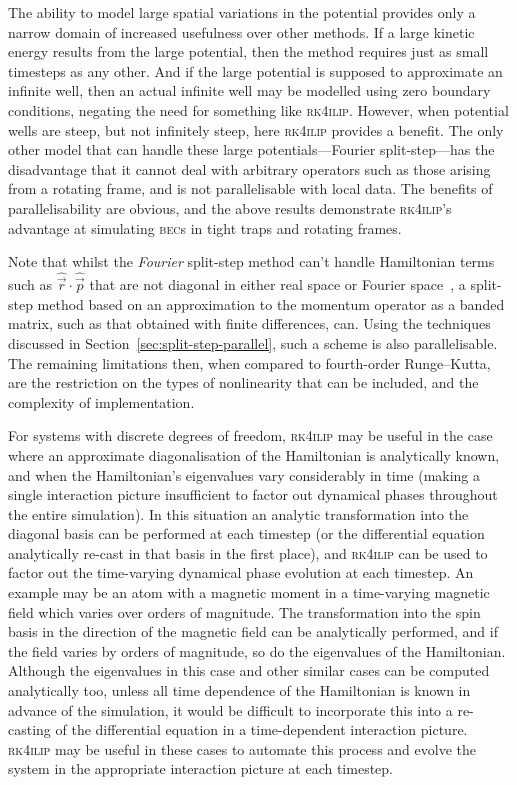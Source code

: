 The ability to model large spatial variations in the potential provides only a narrow domain of increased usefulness over other methods. If a large kinetic energy results from the large potential, then the method requires just as small timesteps as any other. And if the large potential is supposed to approximate an infinite well, then an actual infinite well may be modelled using zero boundary conditions, negating the need for something like \textsc{rk4ilip}. However, when potential wells are steep, but not infinitely steep, here \textsc{rk4ilip} provides a benefit. The only other model that can handle these large potentials---Fourier split-step---has the disadvantage that it cannot deal with arbitrary operators such as those arising from a rotating frame, and is not parallelisable with local data. The benefits of parallelisability are obvious, and the above results demonstrate \textsc{rk4ilip}'s advantage at simulating \textsc{bec}s in tight traps and rotating frames.

Note that whilst the \emph{Fourier} split-step method can't handle Hamiltonian terms such as $\hat {\vec r} \cdot \hat {\vec p}$ that are not diagonal in either real space or Fourier space~\cite[p.~315]{tannor_introduction_2007}, a split-step method based on an approximation to the momentum operator as a banded matrix, such as that obtained with finite differences, can. Using the techniques discussed in Section~\ref{sec:split-step-parallel}, such a scheme is also parallelisable. The remaining limitations then, when compared to fourth-order Runge--Kutta, are the restriction on the types of nonlinearity that can be included, and the complexity of implementation.

For systems with discrete degrees of freedom, \textsc{rk4ilip} may be useful in the case where an approximate diagonalisation of the Hamiltonian is analytically known, and when the Hamiltonian's eigenvalues vary considerably in time (making a single interaction picture insufficient to factor out dynamical phases throughout the entire simulation). In this situation an analytic transformation into the diagonal basis can be performed at each timestep (or the differential equation analytically re-cast in that basis in the first place), and \textsc{rk4ilip} can be used to factor out the time-varying dynamical phase evolution at each timestep. An example may be an atom with a magnetic moment in a time-varying magnetic field which varies over orders of magnitude. The transformation into the spin basis in the direction of the magnetic field can be analytically performed, and if the field varies by orders of magnitude, so do the eigenvalues of the Hamiltonian. Although the eigenvalues in this case and other similar cases can be computed analytically too, unless all time dependence of the Hamiltonian is known in advance of the simulation, it would be difficult to incorporate this into a re-casting of the differential equation in a time-dependent interaction picture. \textsc{rk4ilip} may be useful in these cases to automate this process and evolve the system in the appropriate interaction picture at each timestep.
